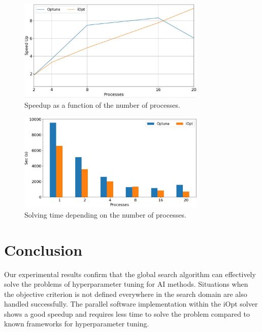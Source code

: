 \documentclass[runningheads]{llncs}
\begin{document}
\begin{figure}
\center
\includegraphics[width=0.8\textwidth]{fig4.png}
\caption{Speedup as a function of the number of processes.} \label{fig4}
\end{figure}

\begin{figure}
\center
\includegraphics[width=0.8\textwidth]{fig5.png}
\caption{Solving time depending on the number of processes.} \label{fig5}
\end{figure}

\section{Conclusion}

Our experimental results confirm that the global search algorithm can effectively solve the problems of hyperparameter tuning for AI methods.  Situations when the objective criterion is not defined everywhere in the search domain are also handled successfully. The parallel software implementation within the iOpt solver shows a good speedup and requires less time to solve the problem compared to known frameworks for hyperparameter tuning.
\end{document}
